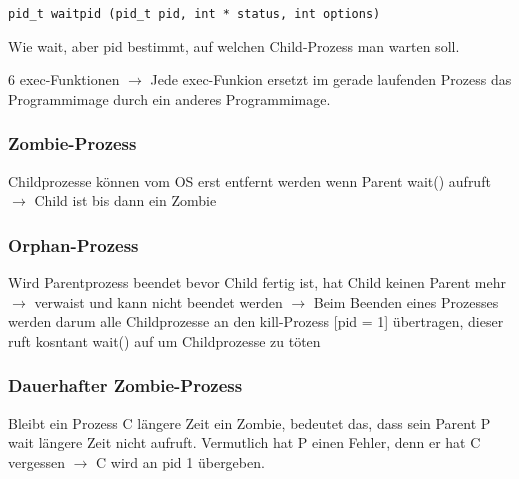 \begin{multicols*}{5}
		\vspace{-5pt}

		\begin{lstlisting}
pid_t waitpid (pid_t pid, int * status, int options)
		\end{lstlisting}
		\vspace{-5pt}
		\begin{compactitem}[$\bullet$]
			\item Wie wait, aber pid bestimmt, auf welchen Child-Prozess man warten soll.
		\end{compactitem}
		
		\vspace{-2pt}

		\drule{\linewidth}{1pt}
	
		6 \textcolor{h}{exec-Funktionen} $\rightarrow$ Jede exec-Funkion ersetzt im gerade laufenden Prozess das Programmimage durch ein anderes Programmimage.\\

		\vspace{-7pt}


		\vspace{-7pt}


	\subsubsection{Zombie-Prozess}
	Childprozesse können vom OS erst entfernt werden wenn Parent wait() aufruft $\rightarrow$ Child ist bis dann ein Zombie
			


	\subsubsection{Orphan-Prozess}
	Wird Parentprozess beendet bevor Child fertig ist, hat Child keinen Parent mehr $\rightarrow$ verwaist und kann nicht beendet werden $\rightarrow$ Beim Beenden eines Prozesses werden darum alle Childprozesse an den kill-Prozess [pid = 1] übertragen, dieser ruft kosntant wait() auf um Childprozesse zu töten
		



	\subsubsection{Dauerhafter Zombie-Prozess}
			Bleibt ein Prozess C längere Zeit ein Zombie, bedeutet das, dass sein Parent P wait längere Zeit nicht aufruft. Vermutlich hat P einen Fehler, denn er hat C vergessen $\rightarrow$ C wird an pid 1 übergeben.
	


\end{multicols*}
